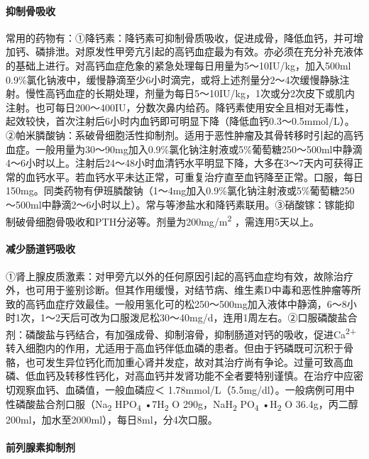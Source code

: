 \paragraph{抑制骨吸收}

常用的药物有：①降钙素：降钙素可抑制骨质吸收，促进成骨，降低血钙，并可增加钙、磷排泄。对原发性甲旁亢引起的高钙血症最为有效。亦必须在充分补充液体的基础上进行。对高钙血症危象的紧急处理每日用量为5～10IU/kg，加入500ml
0.9\%氯化钠液中，缓慢静滴至少6小时滴完，或将上述剂量分2～4次缓慢静脉注射。慢性高钙血症的长期处理，剂量为每日5～10IU/kg，1次或分2次皮下或肌内注射。也可每日200～400IU，分数次鼻内给药。降钙素使用安全且相对无毒性，起效较快，首次注射后6小时内血钙即可明显下降（降低血钙0.3～0.5mmol/L）。②帕米膦酸钠：系破骨细胞活性抑制剂。适用于恶性肿瘤及其骨转移时引起的高钙血症。一般用量为30～90mg加入0.9\%氯化钠注射液或5\%葡萄糖250～500ml中静滴4～6小时以上。注射后24～48小时血清钙水平明显下降，大多在3～7天内可获得正常的血钙水平。若血钙水平未达正常，可重复治疗直至血钙降至正常。口服，每日150mg。同类药物有伊班膦酸钠（1～4mg加入0.9\%氯化钠注射液或5\%葡萄糖250～500ml中静滴2～6小时以上）。常与等渗盐水和降钙素联用。③硝酸镓：镓能抑制破骨细胞骨吸收和PTH分泌等。剂量为200mg/m\textsuperscript{2}
，需连用5天以上。

\paragraph{减少肠道钙吸收}

①肾上腺皮质激素：对甲旁亢以外的任何原因引起的高钙血症均有效，故除治疗外，也可用于鉴别诊断。但其作用缓慢，对结节病、维生素D中毒和恶性肿瘤等所致的高钙血症疗效最佳。一般用氢化可的松250～500mg加入液体中静滴，6～8小时1次，1～2天后可改为口服泼尼松30～40mg/d，连用1周左右。②口服磷酸盐合剂：磷酸盐与钙结合，有加强成骨、抑制溶骨，抑制肠道对钙的吸收，促进Ca\textsuperscript{2+}
转入细胞内的作用，尤适用于高血钙伴低血磷的患者。但由于钙磷既可沉积于骨骼，也可发生异位钙化而加重心肾并发症，故对其治疗尚有争论。过量可致高血磷、低血钙及转移性钙化，对高血钙并发肾功能不全者要特别谨慎。在治疗中应密切观察血钙、血磷值，一般血磷应＜
1.78mmol/L（5.5mg/dl）。一般病例可用中性磷酸盐合剂口服（Na\textsubscript{2}
HPO\textsubscript{4} •7H\textsubscript{2} O 290g，NaH\textsubscript{2}
PO\textsubscript{4} •H\textsubscript{2} O
36.4g，丙二醇200ml，加水至2000ml），每日8ml，分4次口服。

\paragraph{前列腺素抑制剂}

